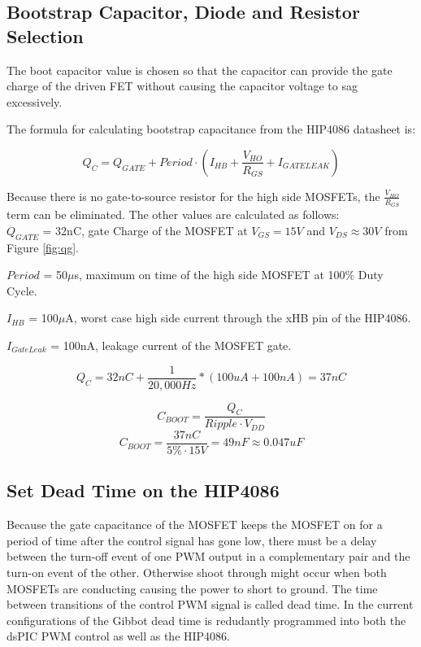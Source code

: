 \documentclass{article}
\begin{document}

\subsection{Bootstrap Capacitor, Diode and Resistor Selection}
\label{sec:bootstrap}
The boot capacitor value is chosen so that the capacitor can provide the gate charge of the driven FET without causing the capacitor voltage to sag excessively. 

The formula for calculating bootstrap capacitance from the HIP4086 datasheet is:

\[Q_C = Q_{GATE} + Period \cdot \left ( I_{HB} + \frac{V_{HO}}{R_{GS}} + I_{GATELEAK} \right )\]

Because there is no gate-to-source resistor for the high side MOSFETs, the $\frac{V_{HO}}{R_{GS}}$ term can be eliminated. The other values are calculated as follows:\\

$Q_{GATE}$ = 32nC, gate Charge of the MOSFET at $V_{GS}=15V$ and $V_{DS} \approx 30V$ from Figure \ref{fig:qg}.

$Period$ = 50$\mu$s, maximum on time of the high side MOSFET at 100\% Duty Cycle.

$I_{HB}$ = 100$\mu$A, worst case high side current through the xHB pin of the HIP4086.

$I_{GateLeak}$ = 100nA, leakage current of the MOSFET gate.

\[Q_C = 32nC + \frac{1}{20,000Hz}*(100uA + 100 nA) = 37nC\]

\[C_{BOOT} = \frac{Q_C}{Ripple \cdot V_{DD}} \]
\[C_{BOOT} = \frac{37nC}{5\% \cdot 15V} = 49nF \approx 0.047uF\]


\subsection{Set Dead Time on the HIP4086}
Because the gate capacitance of the MOSFET keeps the MOSFET on for a period of time after the control signal has gone low, there must be a delay between the turn-off event of one PWM
output in a complementary pair and the turn-on event of the other. Otherwise shoot through might occur when both MOSFETs are conducting causing the power to short to ground. The time between transitions of the control PWM signal is called dead time. In the current configurations of the Gibbot dead time is redudantly programmed into both the dsPIC PWM control as well as the HIP4086. 
\end{document}
